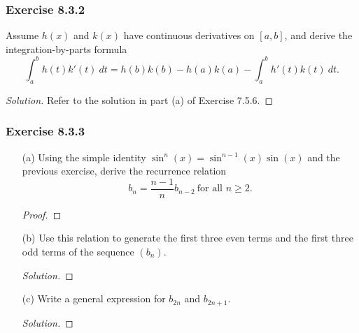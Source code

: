 \subsubsection{Exercise 8.3.2} Assume \( h(x)  \) and \( k(x)  \) have continuous derivatives on \( [a,b]  \), and derive the integration-by-parts formula
\[  \int_{ a }^{ b } h(t) k'(t) \  dt = h(b)k(b) - h(a)k(a) - \int_{ a }^{ b } h'(t) k(t)  \  dt. \]
\begin{proof}[Solution]
Refer to the solution in part (a) of Exercise 7.5.6.
\end{proof}

\subsubsection{Exercise 8.3.3} \begin{enumerate}
    \item[(a)] Using the simple identity \( \sin^{n}(x) = \sin^{n-1}(x) \sin(x)  \) and the previous exercise, derive the recurrence relation 
        \[  b_{n} = \frac{ n-1 }{ n }  b_{n-2} \ \text{for all } n \geq 2. \]
        \begin{proof}
        
        \end{proof}
    \item[(b)] Use this relation to generate the first three even terms and the first three odd terms of the sequence \( (b_{n}) \).
        \begin{proof}[Solution]
        
        \end{proof}
    \item[(c)] Write a general expression for \( b_{2n} \) and \( b_{2n+1}  \).
        \begin{proof}[Solution]
        
        \end{proof}
\end{enumerate}


